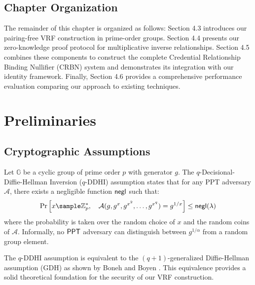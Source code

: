 \subsection*{Chapter Organization}
The remainder of this chapter is organized as follows: Section 4.3 introduces our pairing-free VRF construction in prime-order groups. Section 4.4 presents our zero-knowledge proof protocol for multiplicative inverse relationships. Section 4.5 combines these components to construct the complete Credential Relationship Binding Nullifier (CRBN) system and demonstrates its integration with our identity framework. Finally, Section 4.6 provides a comprehensive performance evaluation comparing our approach to existing techniques.













\section{Preliminaries}
\subsection{Cryptographic Assumptions}

\begin{definition}
Let $\mathbb{G}$ be a cyclic group of prime order $p$ with generator $g$. The $q$-Decisional-Diffie-Hellman Inversion ($q$-DDHI) assumption\cite{mitsunari_new_2002} states that for any PPT adversary $\mathcal{A}$, there exists a negligible function $\mathsf{negl}$ such that:
\[
\Pr\left[ x \sample \Zp^*, \quad \mathcal{A}(g, g^x, g^{x^2}, \ldots, g^{x^q}) = g^{1/x} \right] \leq \negl(\lambda)
\]
where the probability is taken over the random choice of $x$ and the random coins of $\mathcal{A}$. Informally, no $\mathsf{PPT}$ adversary can distinguish between $g^{1/\alpha}$ from a random group element.
\end{definition}

\begin{remark}
The $q$-DDHI assumption is equivalent to the $(q+1)$-generalized Diffie-Hellman assumption (GDH) as shown by Boneh and Boyen \cite{kanade_efficient_2004}. This equivalence provides a solid theoretical foundation for the security of our VRF construction.
\end{remark}

